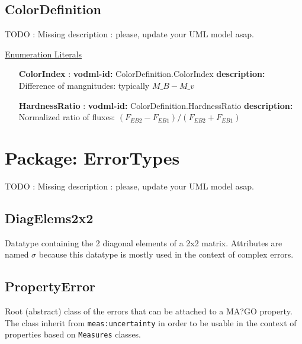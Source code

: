   \subsection{ColorDefinition}
  \label{sect:ColorDefinition}

  TODO : Missing description : please, update your UML model asap.

  \noindent \underline{Enumeration Literals}
  \vspace{-\parsep}
  \small
  \begin{itemize}

    \item[\textbf{ColorIndex}]: \textbf{vodml-id:} ColorDefinition.ColorIndex \newline
          \textbf{description:} Difference of mangnitudes: typically $M\_B - M\_v$
    \item[\textbf{HardnessRatio}]: \textbf{vodml-id:} ColorDefinition.HardnessRatio \newline
          \textbf{description:} Normalized ratio of fluxes: $(F_{EB2} - F_{EB1}) / (F_{EB2} + F_{EB1})$
  \end{itemize}
  \normalsize


\pagebreak
\section{Package: ErrorTypes }


  TODO : Missing description : please, update your UML model asap.

  \subsection{DiagElems2x2}
  \label{sect:ErrorTypes.DiagElems2x2}
  Datatype containing the 2 diagonal elements of a 2x2 matrix. Attributes are named $\sigma$ because this datatype is mostly used in the context of complex errors.

  \subsection{PropertyError}
  \label{sect:ErrorTypes.PropertyError}
  Root (abstract) class of the errors that can be attached to a MA?GO property. The class inherit from \texttt{meas:uncertainty} in order to be usable in the context of properties based on \texttt{Measures} classes.

